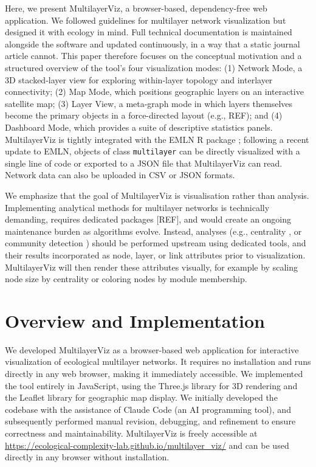 \documentclass{article}
\begin{document}
Here, we present MultilayerViz, a browser-based, dependency-free web application. We followed guidelines for multilayer network visualization \cite{McGee2019-yr} but designed it with ecology in mind. Full technical documentation is maintained alongside the software and updated continuously, in a way that a static journal article cannot. This paper therefore focuses on the conceptual motivation and a structured overview of the tool's four visualization modes: (1) Network Mode, a 3D stacked-layer view for exploring within-layer topology and interlayer connectivity; (2) Map Mode, which positions geographic layers on an interactive satellite map; (3) Layer View, a meta-graph mode in which layers themselves become the primary objects in a force-directed layout (e.g., REF); and (4) Dashboard Mode, which provides a suite of descriptive statistics panels. MultilayerViz is tightly integrated with the EMLN R package \cite{Frydman2023-qe}; following a recent update to EMLN, objects of class \texttt{multilayer} can be directly visualized with a single line of code or exported to a JSON file that MultilayerViz can read. Network data can also be uploaded in CSV or JSON formats. 

We emphasize that the goal of MultilayerViz is visualisation rather than analysis. Implementing analytical methods for multilayer networks is technically demanding, requires dedicated packages [REF], and would create an ongoing maintenance burden as algorithms evolve. Instead, analyses (e.g., centrality \cite{MuxViz}, or community detection \cite{Farage2021-lg}) should be performed upstream using dedicated tools, and their results incorporated as node, layer, or link attributes prior to visualization. MultilayerViz will then render these attributes visually, for example by scaling node size by centrality or coloring nodes by module membership.

\section{Overview and Implementation}
We developed MultilayerViz as a browser-based web application for interactive visualization of ecological multilayer networks. It requires no installation and runs directly in any web browser, making it immediately accessible. We implemented the tool entirely in JavaScript, using the Three.js library for 3D rendering and the Leaflet library for geographic map display. We initially developed the codebase with the assistance of Claude Code (an AI programming tool), and subsequently performed manual revision, debugging, and refinement to ensure correctness and maintainability. MultilayerViz is freely accessible at \url{https://ecological-complexity-lab.github.io/multilayer\_viz/} and can be used directly in any browser without installation.
\end{document}

